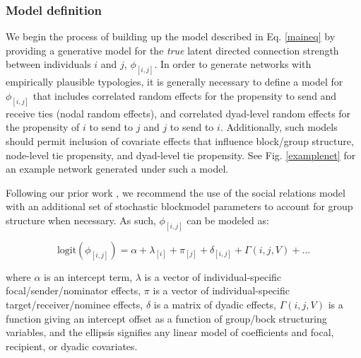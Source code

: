 \documentclass[Afour,sageh,times]{sagej}
\begin{document}
\subsubsection{Model definition}
We begin the process of building up the model described in Eq. \ref{maineq} by providing a generative model for the \emph{true} latent directed connection strength between individuals $i$ and $j$, $\phi_{[i,j]}$. In order to generate  networks with empirically plausible typologies, it is generally necessary to define a model for $\phi_{[i,j]}$ that includes correlated random effects for the propensity to send and receive ties (nodal random effects), and correlated dyad-level random effects for the propensity of $i$ to send to $j$ and $j$ to send to $i$. Additionally, such models should permit inclusion of covariate effects that influence block/group structure, node-level tie propensity, and dyad-level tie propensity. See Fig. \ref{examplenet} for an example network generated under such a model.

Following our prior work \citep{redhead2021reliable, ross2022modelling}, we recommend the use of the social relations model \citep{kenny1984social, snijders1999social, back2010social} with an additional set of stochastic blockmodel parameters \citep{holland1983stochastic, karrer2011stochastic, peixoto2019bayesian} to account for group structure when necessary. As such, $\phi_{[i,j]}$ can be modeled as:
\begin{ceqn}
\begin{equation}\label{link}
\text{logit}(\phi_{[i,j]}) = \alpha + \lambda_{[i]} + \pi_{[j]} + \delta_{[i,j]} + \Gamma(i,j,V) + \ldots 
\end{equation}
\end{ceqn}
where $\alpha$ is an intercept term, $\lambda$ is a vector of individual-specific focal/sender/nominator effects, $\pi$ is a vector of individual-specific target/receiver/nominee effects, $\delta$ is a matrix of dyadic effects, $\Gamma(i,j,V)$ is a function giving an intercept offset as a function of group/bock structuring variables, and the ellipsis signifies any linear model of coefficients and focal, recipient, or dyadic covariates. 
\end{document}
